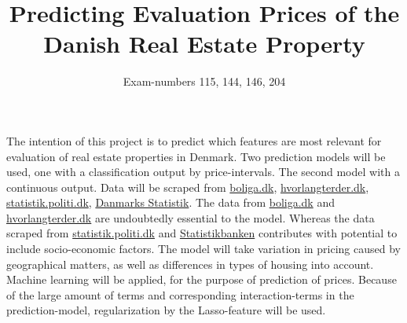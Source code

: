 \documentclass[12pt,a4paper]{article}
\begin{document}
\title{Predicting Evaluation Prices of the Danish Real Estate Property} 
\author{Exam-numbers 115, 144, 146, 204}
\maketitle
\section*{}
The intention of this project is to predict which features are most relevant for evaluation of real estate properties in Denmark. Two prediction models will be used, one with a classification output by price-intervals. The second model with a continuous output. Data will be scraped from \href{https://www.boliga.dk}{boliga.dk}, \href{https://www.hvorlangterder.dk}{hvorlangterder.dk}, \href{https://statistik.politi.dk/QvAJAXZfc/opendoc.htm?document=QlikApplication%2F2999_Public\%2FPublic_IndsatsResultater.qvw}{statistik.politi.dk},
 \href{https://www.dst.dk/da/Statistik/emner/befolkning-og-valg}{Danmarks Statistik}.
The data from \href{https://www.boliga.dk}{boliga.dk} and \href{https://www.hvorlangterder.dk}{hvorlangterder.dk} are undoubtedly essential to the model. Whereas the data scraped from \href{https://statistik.politi.dk/QvAJAXZfc/opendoc.htm?document=QlikApplication%2F2999_Public\%2FPublic_IndsatsResultater.qvw}{statistik.politi.dk} 
and \href{https://statistikbanken.dk/statbank5a/default.asp?w=1280}{Statistikbanken} contributes with potential to include socio-economic factors.\newline
The model will take variation in pricing caused by geographical matters, as well as differences in types of housing into account.
Machine learning will be applied, for the purpose of prediction of prices. Because of the large amount of terms and corresponding interaction-terms in the prediction-model, regularization by the Lasso-feature will be used. 
\end{document}
